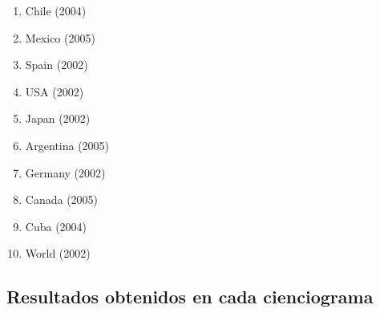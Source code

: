 \documentclass[10pt,a4paper,spanish]{article}
\numberwithin{equation}{section} %
\numberwithin{figure}{section} %
\numberwithin{table}{section} %
\begin{document}
\begin{enumerate}[\qquad\ ---]
    \item Chile (2004)
    \item Mexico (2005)
    \item Spain (2002)
    \item USA (2002)
    \item Japan (2002)
    \item Argentina (2005)
    \item Germany (2002)
    \item Canada (2005)
    \item Cuba (2004)
    \item World (2002)
\end{enumerate}


\subsection{Resultados obtenidos en cada cienciograma}
\end{document}
